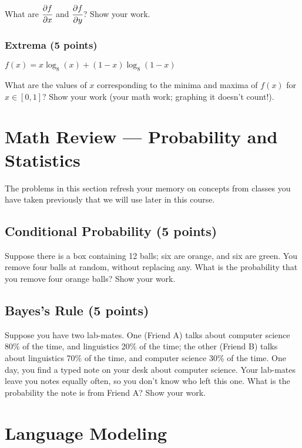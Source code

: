 \documentclass[12pt,a4paper]{article}
\begin{document}
What are $\cfrac{\partial f}{\partial x}$ and $\cfrac{\partial f}{\partial y}$? Show your work.

\subsubsection{Extrema (5 points)}

\begin{center}
$f(x) = x \log_8 (x) + (1 - x) \log_8 (1 - x)$
\end{center}

What are the values of $x$ corresponding to the minima and maxima of $f(x)$ for $x \in [0, 1]$? Show your work (your math work; graphing it doesn't count!).

\section{Math Review --- Probability and Statistics}

The problems in this section refresh your memory on concepts from classes you have taken previously that we will use later in this course.

\subsection{Conditional Probability (5 points)}

Suppose there is a box containing 12 balls; six are orange, and six are green. You remove four balls at random, without replacing any. What is the probability that you remove four orange balls? Show your work.

\subsection{Bayes's Rule (5 points)}

Suppose you have two lab-mates. One (Friend A) talks about computer science 80\% of the time, and linguistics 20\% of the time; the other (Friend B) talks about linguistics 70\% of the time, and computer science 30\% of the time. One day, you find a typed note on your desk about computer science. Your lab-mates leave you notes equally often, so you don't know who left this one. What is the probability the note is from Friend A? Show your work.

\section{Language Modeling}
\end{document}

